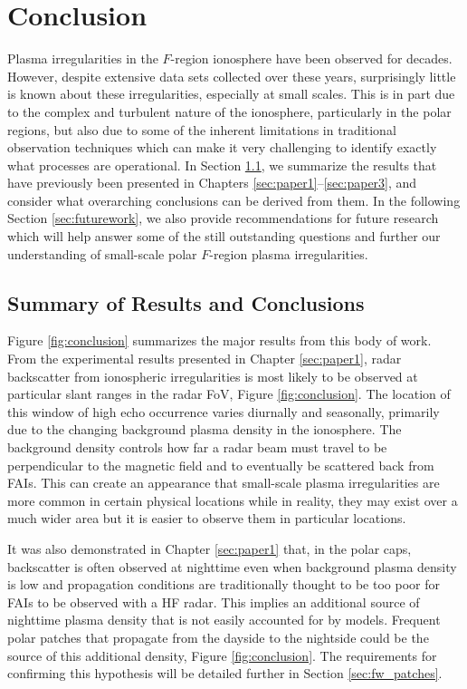 
\chapter{Conclusion}
\label{sec:conclusion}

Plasma irregularities in the \(F\)-region ionosphere have been observed for decades.  However, despite extensive data sets collected over these years, surprisingly little is known about these irregularities, especially at small scales.  This is in part due to the complex and turbulent nature of the ionosphere, particularly in the polar regions, but also due to some of the inherent limitations in traditional observation techniques which can make it very challenging to identify exactly what processes are operational.  In Section \ref{sec:summary}, we summarize the results that have previously been presented in Chapters \ref{sec:paper1}--\ref{sec:paper3}, and consider what overarching conclusions can be derived from them.  In the following Section \ref{sec:futurework}, we also provide recommendations for future research which will help answer some of the still outstanding questions and further our understanding of small-scale polar \(F\)-region plasma irregularities.

\section{Summary of Results and Conclusions}
\label{sec:summary}

Figure \ref{fig:conclusion} summarizes the major results from this body of work.  From the experimental results presented in Chapter \ref{sec:paper1}, radar backscatter from ionospheric irregularities is most likely to be observed at particular slant ranges in the radar FoV, Figure \ref{fig:conclusion}.  The location of this window of high echo occurrence varies diurnally and seasonally, primarily due to the changing background plasma density in the ionosphere.  The background density controls how far a radar beam must travel to be perpendicular to the magnetic field and to eventually be scattered back from FAIs.  This can create an appearance that small-scale plasma irregularities are more common in certain physical locations while in reality, they may exist over a much wider area but it is easier to observe them in particular locations. 

It was also demonstrated in Chapter \ref{sec:paper1} that, in the polar caps, backscatter is often observed at nighttime even when background plasma density is low and propagation conditions are traditionally thought to be too poor for FAIs to be observed with a HF radar.  This implies an additional source of nighttime plasma density that is not easily accounted for by models.  Frequent polar patches that propagate from the dayside to the nightside could be the source of this additional density, Figure \ref{fig:conclusion}.  The requirements for confirming this hypothesis will be detailed further in Section \ref{sec:fw_patches}.

